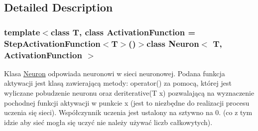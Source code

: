 \subsection{\-Detailed \-Description}
\subsubsection*{template$<$class T, class Activation\-Function = \-Step\-Activation\-Function$<$\-T$>$()$>$class Neuron$<$ T, Activation\-Function $>$}

\-Klasa \hyperlink{class_neuron}{\-Neuron} odpowiada neuronowi w sieci neuronowej. \-Podana funkcja aktywacji jest klasą zawierającą metody\-: operator() za pomocą, której jest wyliczane pobudzenie neuronu oraz deriterative(\-T x) pozwalającą na wyznaczenie pochodnej funkcji aktywacji w punkcie x (jest to niezbędne do realizacji procesu uczenia się sieci). \-Współczynnik uczenia jest ustalony na sztywno na 0. (co z tym idzie aby sieć mogła się uczyć nie należy używać liczb całkowytych). 

